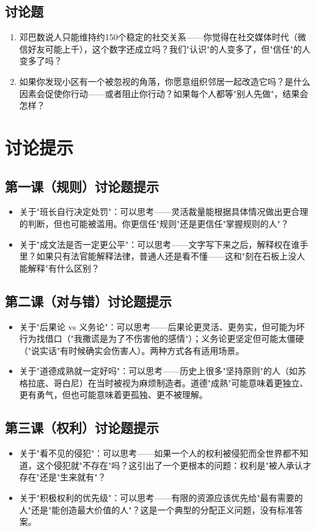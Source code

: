 \documentclass[a4paper,12pt]{ctexart}
\begin{document}
\subsection*{讨论题}
\begin{enumerate}
  \item 邓巴数说人只能维持约150个稳定的社交关系——你觉得在社交媒体时代（微信好友可能上千），这个数字还成立吗？我们"认识"的人变多了，但"信任"的人变多了吗？
  \item 如果你发现小区有一个被忽视的角落，你愿意组织邻居一起改造它吗？是什么因素会促使你行动——或者阻止你行动？如果每个人都等"别人先做"，结果会怎样？
\end{enumerate}

\section*{讨论提示}

\subsection*{第一课（规则）讨论题提示}
\begin{itemize}
  \item 关于"班长自行决定处罚"：可以思考——灵活裁量能根据具体情况做出更合理的判断，但也可能被滥用。你更信任"规则"还是更信任"掌握规则的人"？
  \item 关于"成文法是否一定更公平"：可以思考——文字写下来之后，解释权在谁手里？如果只有法官能解释法律，普通人还是看不懂——这和"刻在石板上没人能解释"有什么区别？
\end{itemize}

\subsection*{第二课（对与错）讨论题提示}
\begin{itemize}
  \item 关于"后果论 vs 义务论"：可以思考——后果论更灵活、更务实，但可能为坏行为找借口（"我撒谎是为了不伤害他的感情"）；义务论更坚定但可能太僵硬（"说实话"有时候确实会伤害人）。两种方式各有适用场景。
  \item 关于"道德成熟就一定好吗"：可以思考——历史上很多"坚持原则"的人（如苏格拉底、哥白尼）在当时被视为麻烦制造者。道德"成熟"可能意味着更独立、更有勇气，但也可能意味着更孤独、更不被理解。
\end{itemize}

\subsection*{第三课（权利）讨论题提示}
\begin{itemize}
  \item 关于"看不见的侵犯"：可以思考——如果一个人的权利被侵犯而全世界都不知道，这个侵犯就"不存在"吗？这引出了一个更根本的问题：权利是"被人承认才存在"还是"生来就有"？
  \item 关于"积极权利的优先级"：可以思考——有限的资源应该优先给"最有需要的人"还是"能创造最大价值的人"？这是一个典型的分配正义问题，没有标准答案。
\end{itemize}
\end{document}
